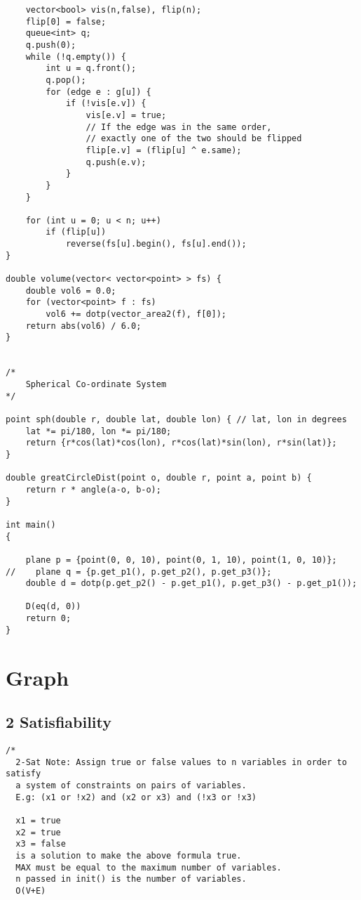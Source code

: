 \documentclass[10pt,a4paper,onesided]{article}
\begin{document}
\begin{multicols*}{3}
\begin{lstlisting}
    vector<bool> vis(n,false), flip(n);
    flip[0] = false;
    queue<int> q;
    q.push(0);
    while (!q.empty()) {
        int u = q.front();
        q.pop();
        for (edge e : g[u]) {
            if (!vis[e.v]) {
                vis[e.v] = true;
                // If the edge was in the same order,
                // exactly one of the two should be flipped
                flip[e.v] = (flip[u] ^ e.same);
                q.push(e.v);
            }
        }
    }

    for (int u = 0; u < n; u++)
        if (flip[u])
            reverse(fs[u].begin(), fs[u].end());
}

double volume(vector< vector<point> > fs) {
    double vol6 = 0.0;
    for (vector<point> f : fs)
        vol6 += dotp(vector_area2(f), f[0]);
    return abs(vol6) / 6.0;
}


/*
    Spherical Co-ordinate System
*/

point sph(double r, double lat, double lon) { // lat, lon in degrees
    lat *= pi/180, lon *= pi/180;
    return {r*cos(lat)*cos(lon), r*cos(lat)*sin(lon), r*sin(lat)};
}

double greatCircleDist(point o, double r, point a, point b) {
    return r * angle(a-o, b-o);
}

int main()
{

    plane p = {point(0, 0, 10), point(0, 1, 10), point(1, 0, 10)};
//    plane q = {p.get_p1(), p.get_p2(), p.get_p3()};
    double d = dotp(p.get_p2() - p.get_p1(), p.get_p3() - p.get_p1());

    D(eq(d, 0))
    return 0;
}

\end{lstlisting}
\section{Graph}
\subsection{2 Satisfiability}
\begin{lstlisting}
/*
  2-Sat Note: Assign true or false values to n variables in order to satisfy
  a system of constraints on pairs of variables.
  E.g: (x1 or !x2) and (x2 or x3) and (!x3 or !x3)

  x1 = true
  x2 = true
  x3 = false
  is a solution to make the above formula true.
  MAX must be equal to the maximum number of variables.
  n passed in init() is the number of variables.
  O(V+E)


\end{lstlisting}
\end{multicols*}
\end{document}
